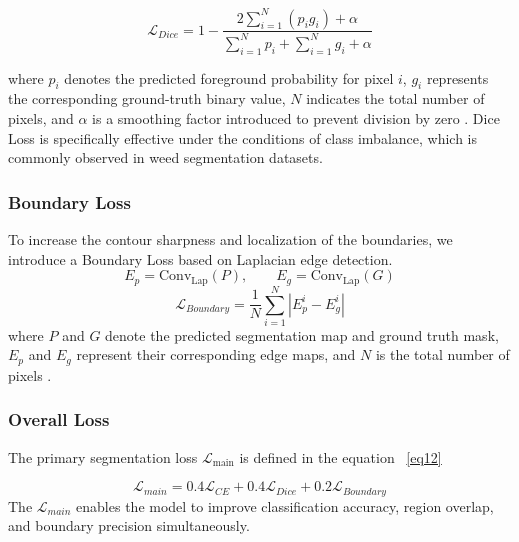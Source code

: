\documentclass[pdflatex,sn-mathphys-num]{sn-jnl}
\begin{document}
\begin{equation}
\mathcal{L}_{Dice} = 1 - \frac{2 \sum_{i=1}^{N} (p_i g_i) + \alpha}
{\sum_{i=1}^{N} p_i + \sum_{i=1}^{N} g_i + \alpha}
\label{eq:dice_loss}
\end{equation}

where $p_i$ denotes the predicted foreground probability for pixel $i$, $g_i$ represents the corresponding ground-truth binary value, $N$ indicates the total number of pixels, and $\alpha$ is a smoothing factor introduced to prevent division by zero \cite{milletari2016vnet}.
Dice Loss is specifically effective under the conditions of class imbalance, which is commonly observed in weed segmentation datasets.
\subsubsection{Boundary Loss}
To increase the contour sharpness and localization of the boundaries, we introduce a Boundary Loss based on Laplacian edge detection. 
\begin{equation}
E_{p} = \text{Conv}_{\text{Lap}}(P), \qquad
E_{g} = \text{Conv}_{\text{Lap}}(G)
\end{equation}
\begin{equation}
\mathcal{L}_{Boundary} = \frac{1}{N} \sum_{i=1}^{N} \left| E_{p}^{i} - E_{g}^{i} \right|
\label{eq:boundary_loss}
\end{equation}
where $P$ and $G$ denote the predicted segmentation map and ground truth mask, $E_p$ and $E_g$ represent their corresponding edge maps, and $N$ is the total number of pixels \cite{kervadec2019boundary}.
\subsubsection{Overall Loss}

The primary segmentation loss $\mathcal{L}_{\text{main}}$ is defined in the equation ~\ref{eq12}

\begin{equation}
\mathcal{L}_{main} =
0.4\mathcal{L}_{CE}
+
0.4\mathcal{L}_{Dice}
+
0.2\mathcal{L}_{Boundary}\label{eq12}
\end{equation}
The $\mathcal{L}_{main}$ enables the model to improve classification accuracy, region overlap, and boundary precision simultaneously.
\end{document}
